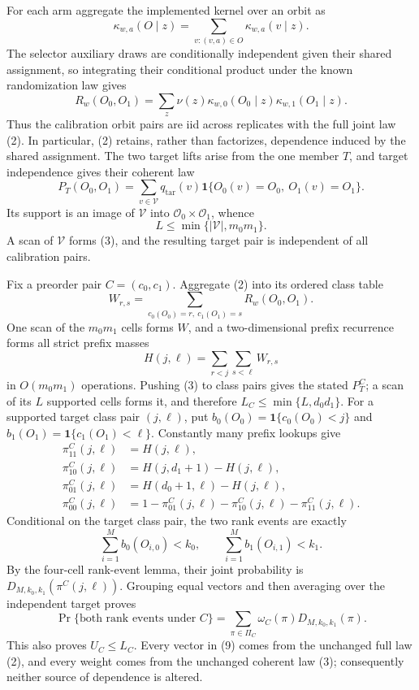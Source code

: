 For each arm aggregate the implemented kernel over an orbit as
\[
\kappa_{w,a}(O\mid z)=\sum_{v:(v,a)\in O}\kappa_{w,a}(v\mid z).
\tag{1}
\]
The selector auxiliary draws are conditionally independent given their shared assignment, so integrating their conditional product under the known randomization law gives
\[
R_w(O_0,O_1)=\sum_z\nu(z)\kappa_{w,0}(O_0\mid z)\kappa_{w,1}(O_1\mid z).
\tag{2}
\]
Thus the calibration orbit pairs are iid across replicates with the full joint law (2). In particular, (2) retains, rather than factorizes, dependence induced by the shared assignment. The two target lifts arise from the one member \(T\), and target independence gives their coherent law
\[
P_T(O_0,O_1)=\sum_{v\in\mathcal V}q_{\mathrm{tar}}(v)\mathbf 1\{O_0(v)=O_0,\ O_1(v)=O_1\}.
\tag{3}
\]
Its support is an image of \(\mathcal V\) into \(\mathcal O_0\times\mathcal O_1\), whence
\[
L\le\min\{|\mathcal V|,m_0m_1\}.
\tag{4}
\]
A scan of \(\mathcal V\) forms (3), and the resulting target pair is independent of all calibration pairs.

Fix a preorder pair \(C=(c_0,c_1)\). Aggregate (2) into its ordered class table
\[
W_{r,s}=\sum_{c_0(O_0)=r,\ c_1(O_1)=s}R_w(O_0,O_1).
\tag{5}
\]
One scan of the \(m_0m_1\) cells forms \(W\), and a two-dimensional prefix recurrence forms all strict prefix masses
\[
H(j,\ell)=\sum_{r<j}\sum_{s<\ell}W_{r,s}
\tag{6}
\]
in \(O(m_0m_1)\) operations. Pushing (3) to class pairs gives the stated \(P_T^C\); a scan of its \(L\) supported cells forms it, and therefore \(L_C\le\min\{L,d_0d_1\}\). For a supported target class pair \((j,\ell)\), put \(b_0(O_0)=\mathbf 1\{c_0(O_0)<j\}\) and \(b_1(O_1)=\mathbf 1\{c_1(O_1)<\ell\}\). Constantly many prefix lookups give
\[
\begin{aligned}
\pi^C_{11}(j,\ell)&=H(j,\ell),\\
\pi^C_{10}(j,\ell)&=H(j,d_1+1)-H(j,\ell),\\
\pi^C_{01}(j,\ell)&=H(d_0+1,\ell)-H(j,\ell),\\
\pi^C_{00}(j,\ell)&=1-\pi^C_{01}(j,\ell)-\pi^C_{10}(j,\ell)-\pi^C_{11}(j,\ell).
\end{aligned}
\tag{7}
\]
Conditional on the target class pair, the two rank events are exactly
\[
\sum_{i=1}^M b_0(O_{i,0})<k_0,\qquad \sum_{i=1}^M b_1(O_{i,1})<k_1.
\tag{8}
\]
By the four-cell rank-event lemma, their joint probability is \(D_{M,k_0,k_1}(\pi^C(j,\ell))\). Grouping equal vectors and then averaging over the independent target proves
\[
\Pr\{\text{both rank events under }C\}=\sum_{\pi\in\Pi_C}\omega_C(\pi)D_{M,k_0,k_1}(\pi).
\tag{9}
\]
This also proves \(U_C\le L_C\). Every vector in (9) comes from the unchanged full law (2), and every weight comes from the unchanged coherent law (3); consequently neither source of dependence is altered.

